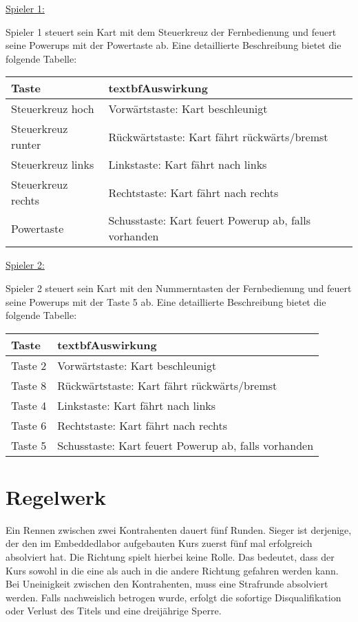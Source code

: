 \underline{Spieler 1:}

Spieler 1 steuert sein Kart mit dem Steuerkreuz der Fernbedienung und feuert seine Powerups mit der Powertaste ab. Eine detaillierte Beschreibung bietet die folgende Tabelle:

\vspace{0.5cm}
\begin{tabular}{|l|l|}
\hline
\textbf{Taste} & textbf{Auswirkung} \\ \hline
Steuerkreuz hoch & Vorwärtstaste: Kart beschleunigt \\ \hline
Steuerkreuz runter & Rückwärtstaste: Kart fährt rückwärts/bremst \\ \hline
Steuerkreuz links & Linkstaste: Kart fährt nach links \\ \hline
Steuerkreuz rechts & Rechtstaste: Kart fährt nach rechts \\ \hline
Powertaste & Schusstaste: Kart feuert Powerup ab, falls vorhanden \\ \hline  
\end{tabular} 
\vspace{0.5cm}

\underline{Spieler 2:}
 
Spieler 2 steuert sein Kart mit den Nummerntasten der Fernbedienung und feuert seine Powerups mit der Taste 5 ab. Eine detaillierte Beschreibung bietet die folgende Tabelle:

\vspace{0.5cm}
\begin{tabular}{|l|l|}
\hline
\textbf{Taste} & textbf{Auswirkung} \\ \hline
Taste 2 & Vorwärtstaste: Kart beschleunigt \\ \hline
Taste 8 & Rückwärtstaste: Kart fährt rückwärts/bremst \\ \hline
Taste 4 & Linkstaste: Kart fährt nach links \\ \hline
Taste 6 & Rechtstaste: Kart fährt nach rechts \\ \hline
Taste 5 & Schusstaste: Kart feuert Powerup ab, falls vorhanden \\ \hline 
\end{tabular}
\vspace{0.5cm}

\section{Regelwerk}
Ein Rennen zwischen zwei Kontrahenten dauert fünf Runden. Sieger ist derjenige, der den im Embeddedlabor aufgebauten Kurs zuerst fünf mal erfolgreich absolviert hat. Die Richtung spielt hierbei keine Rolle. Das bedeutet, dass der Kurs sowohl in die eine als auch in die andere Richtung gefahren werden kann. Bei Uneinigkeit zwischen den Kontrahenten, muss eine Strafrunde absolviert werden. Falls nachweislich betrogen wurde, erfolgt die sofortige Disqualifikation oder Verlust des Titels und eine dreijährige Sperre. 


